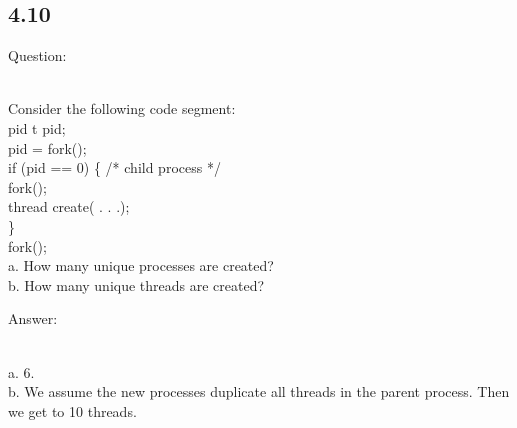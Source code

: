 \documentclass[]{article}
\begin{document}
\subsection*{4.10}
\begin{bfseries} Question: \end{bfseries}\\
Consider the following code segment:\\
pid t pid;\\
pid = fork();\\
if (pid == 0) \{ /* child process */\\
	\null\qquad fork();\\
	\null\qquad thread create( . . .);\\
\}\\
fork();\\
a. How many unique processes are created?\\
b. How many unique threads are created?\\
\begin{bfseries} Answer: \end{bfseries}\\
a. 6.\\
b. We assume the new processes duplicate all threads in the parent process. Then we get to 10 threads.
\end{document}
